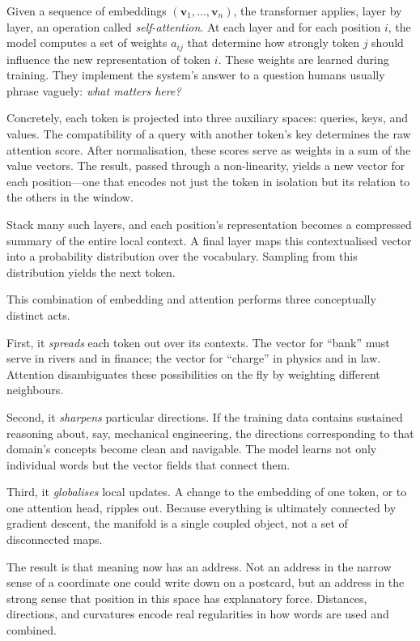 \documentclass[12pt,a4paper]{report}
\begin{document}
Given a sequence of embeddings $(\mathbf{v}_1, \ldots, \mathbf{v}_n)$, the transformer applies, layer by layer, an operation called \emph{self-attention}. At each layer and for each position $i$, the model computes a set of weights $a_{ij}$ that determine how strongly token $j$ should influence the new representation of token $i$. These weights are learned during training. They implement the system's answer to a question humans usually phrase vaguely: \emph{what matters here?}

Concretely, each token is projected into three auxiliary spaces: queries, keys, and values. The compatibility of a query with another token's key determines the raw attention score. After normalisation, these scores serve as weights in a sum of the value vectors. The result, passed through a non-linearity, yields a new vector for each position---one that encodes not just the token in isolation but its relation to the others in the window.

Stack many such layers, and each position's representation becomes a compressed summary of the entire local context. A final layer maps this contextualised vector into a probability distribution over the vocabulary. Sampling from this distribution yields the next token.

This combination of embedding and attention performs three conceptually distinct acts.

First, it \emph{spreads} each token out over its contexts. The vector for ``bank'' must serve in rivers and in finance; the vector for ``charge'' in physics and in law. Attention disambiguates these possibilities on the fly by weighting different neighbours.

Second, it \emph{sharpens} particular directions. If the training data contains sustained reasoning about, say, mechanical engineering, the directions corresponding to that domain's concepts become clean and navigable. The model learns not only individual words but the vector fields that connect them.

Third, it \emph{globalises} local updates. A change to the embedding of one token, or to one attention head, ripples out. Because everything is ultimately connected by gradient descent, the manifold is a single coupled object, not a set of disconnected maps.

The result is that meaning now has an address. Not an address in the narrow sense of a coordinate one could write down on a postcard, but an address in the strong sense that position in this space has explanatory force. Distances, directions, and curvatures encode real regularities in how words are used and combined.
\end{document}
